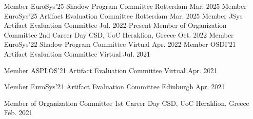 \begin{cvhonors}
	\cvhonor
	{Member} %
	{EuroSys'25 Shadow Program Committee} %
	{Rotterdam} %
	{Mar. 2025} %
	\cvhonor
	{Member} %
	{EuroSys'25 Artifact Evaluation Committee} %
	{Rotterdam} %
	{Mar. 2025} %
	\cvhonor
	{Member} %
	{JSys Artifact Evaluation Committee} %
	{} %
	{Jul. 2022-Present} %
	\cvhonor
	{Member of Organization Committee} %
	{2nd Career Day CSD, UoC} %
	{Heraklion, Greece} %
	{Oct. 2022} %
	\cvhonor
	{Member} %
	{EuroSys'22 Shadow Program Committee} %
	{Virtual} %
	{Apr. 2022} %
	\cvhonor
	{Member} %
	{OSDI'21 Artifact Evaluation Committee} %
	{Virtual} %
	{Jul. 2021} %

	\cvhonor
	{Member} %
	{ASPLOS'21 Artifact Evaluation Committee} %
	{Virtual} %
	{Apr. 2021} %


	\cvhonor
	{Member} %
	{EuroSys'21 Artifact Evaluation Committee} %
	{Edinburgh} %
	{Apr. 2021} %

	\cvhonor
	{Member of Organization Committee} %
	{1st Career Day CSD, UoC} %
	{Heraklion, Greece} %
	{Feb. 2021} %


\end{cvhonors}
